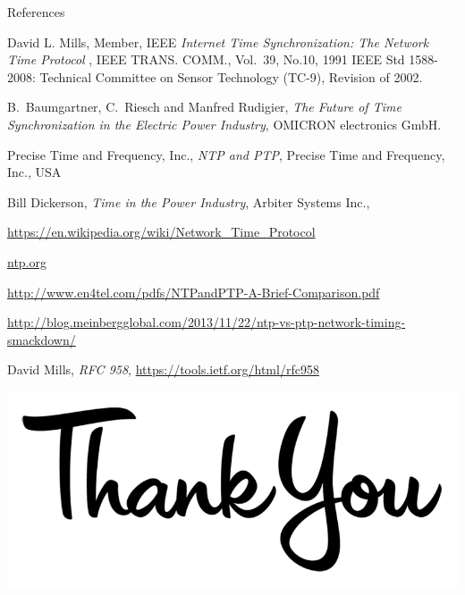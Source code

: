 \documentclass{beamer}
\begin{document}
    
    \begin{frame}{References}
\begin{thebibliography}{1}
	\tiny
	
	David L.  Mills,  Member,  IEEE \emph{Internet  Time  Synchronization: 
		The  Network  Time  Protocol }, IEEE  TRANS. COMM., Vol.~39, No.10,  1991 
	IEEE Std 1588-2008: Technical Committee on Sensor Technology (TC-9), Revision of 2002.
	
	B.~Baumgartner, C.~Riesch and Manfred Rudigier, \emph{The Future of Time Synchronization in the Electric Power Industry}, OMICRON electronics GmbH.
	
	Precise Time and Frequency, Inc., \emph{NTP and PTP}, Precise Time and Frequency, Inc., USA  
	
	Bill Dickerson, \emph{Time in the Power Industry}, Arbiter Systems Inc.,
	
	\url{https://en.wikipedia.org/wiki/Network_Time_Protocol}
	
	\url{ntp.org}
	
	\url{http://www.en4tel.com/pdfs/NTPandPTP-A-Brief-Comparison.pdf}
	
	\url{http://blog.meinbergglobal.com/2013/11/22/ntp-vs-ptp-network-timing-smackdown/}
	
	David Mills, \emph{RFC 958}, \url{https://tools.ietf.org/html/rfc958}
\end{thebibliography}
    \end{frame}


   \begin{frame}
   \begin{center}
   \includegraphics[scale=0.3]{thanku.png}
   \end{center}
   \end{frame}
\end{document}
